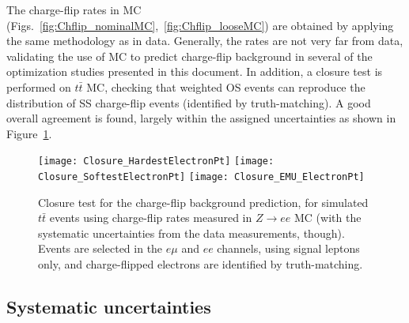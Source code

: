 The charge-flip rates in MC (Figs.~\ref{fig:Chflip_nominalMC},~\ref{fig:Chflip_looseMC}) 
are obtained by applying the same methodology as in data. 
Generally, the rates are not very far from data, validating the use of MC to predict charge-flip background 
in several of the optimization studies presented in this document. 
In addition, a closure test is performed on $t\bar t$ MC, 
checking that weighted OS events can reproduce the distribution of SS charge-flip events (identified by truth-matching). 
A good overall agreement is found, largely within the assigned uncertainties
as shown in Figure~\ref{fig:ChargeFlip_ClosureTest}. 

\begin{figure}[htb!]
\centering
{\texttt{[image: Closure\_HardestElectronPt]}}
{\texttt{[image: Closure\_SoftestElectronPt]}}
{\texttt{[image: Closure\_EMU\_ElectronPt]}}
\caption{Closure test for the charge-flip background prediction, for simulated $t\bar t$ events 
using charge-flip rates measured in $Z\to ee$ MC 
(with the systematic uncertainties from the data measurements, though). 
Events are selected in the $e\mu$ and $ee$ channels, using signal leptons only, 
and charge-flipped electrons are identified by truth-matching. 
}
\label{fig:ChargeFlip_ClosureTest}
\end{figure}

\subsection*{Systematic uncertainties}
\label{subsec:chargeflip_uncertainties}


